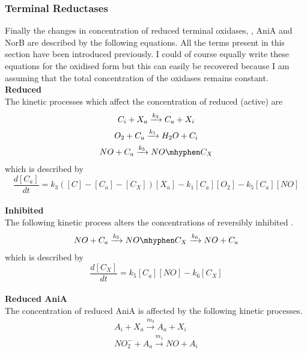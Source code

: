 \subsubsection{Terminal Reductases}
Finally the changes in concentration of reduced terminal oxidases, \cbbthree{}, AniA and NorB are described by the following equations. All the terms present in this section have been introduced previously. I could of course equally write these equations for the oxidised form but this can easily be recovered because I am assuming that the total concentration of the oxidases remains constant.\\
{\bf Reduced \cbbthree{}}\\
The kinetic processes which affect the concentration of reduced (active) \cbbthree{} are
\begin{equation*}
\begin{gathered}
C_i + X_a \xrightarrow{k_3} C_a + X_i\\
O_2 + C_a\xrightarrow{k_1} H_{2}O + C_i\\
NO + C_a \xrightarrow{k_5} NO\mhyphen C_X 
\end{gathered}
\end{equation*}
which is described by
\begin{equation}
\frac{d[C_a]}{dt} = k_3([C] - [C_a] - [C_X])[X_a] - k_{1}[C_a][O_2] - k_5[C_a][NO]
\label{eq:active_cbb3}
\end{equation}
\\
{\bf Inhibited \cbbthree{}}\\
The following kinetic process alters the concentrations of reversibly inhibited \cbbthree{}.
\begin{equation*}
\begin{gathered}
 NO + C_a \xrightarrow{k_5} NO\mhyphen C_X \xrightarrow{k_6} NO + C_a
\end{gathered}
\end{equation*}
which is described by
\begin{equation}
\frac{d[C_X]}{dt} = k_5[C_a][NO] - k_6 [C_X]
\label{eq:NO inhibited_cbb3}
\end{equation}
\\
{\bf Reduced AniA}\\
The concentration of reduced AniA is affected by the following kinetic processes.
\begin{equation*}
\begin{gathered}
A_i + X_a \xrightarrow{m_3} A_a + X_i \\
NO_2^- + A_a \xrightarrow{m_1} NO + A_i 
\end{gathered}
\end{equation*}
